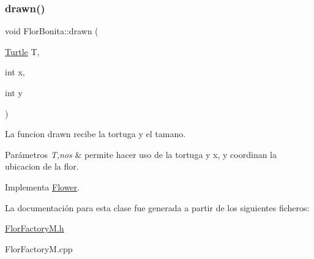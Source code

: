 \mbox{\label{classFlorBonita_a028f32ccf00bb677f54349afa49657e4}} 
\subsubsection{\texorpdfstring{drawn()}{drawn()}}
{\footnotesize\ttfamily void Flor\+Bonita\+::drawn (\begin{DoxyParamCaption}\item[{\hyperlink{classTurtle}{Turtle}}]{T,  }\item[{int}]{x,  }\item[{int}]{y }\end{DoxyParamCaption})\hspace{0.3cm}{\ttfamily [virtual]}}

La funcion drawn recibe la tortuga y el tamano. 
\begin{DoxyParams}{Parámetros}
{\em T,nos} & permite hacer uso de la tortuga y x, y coordinan la ubicacion de la flor. \\
\hline
\end{DoxyParams}


Implementa \hyperlink{classFlower_af01eea570f9d02e16cda1d86ee97633c}{Flower}.



La documentación para esta clase fue generada a partir de los siguientes ficheros\+:\begin{DoxyCompactItemize}
\item 
\hyperlink{FlorFactoryM_8h}{Flor\+Factory\+M.\+h}\item 
Flor\+Factory\+M.\+cpp\end{DoxyCompactItemize}
